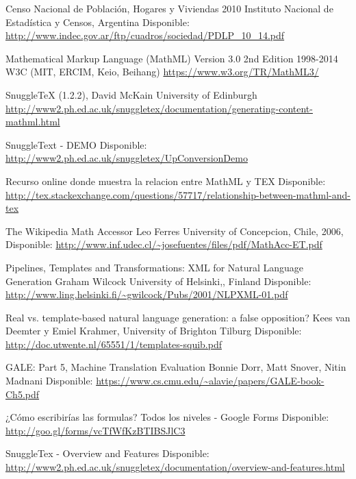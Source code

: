 \documentclass[
11pt, %
oneside, %
english, %
doublespacing, %
nolistspacing, %
parskip, %
parident,
headsepline, %
]{MastersDoctoralThesis} %
\begin{document}
\renewcommand{\bibname}{Referencias}
\begin{thebibliography}{99}

Censo Nacional de Población,
Hogares y Viviendas 2010
Instituto Nacional de Estadística y Censos, Argentina
Disponible: \url{http://www.indec.gov.ar/ftp/cuadros/sociedad/PDLP_10_14.pdf}

Mathematical Markup Language (MathML) Version 3.0 2nd Edition
1998-2014 W3C (MIT, ERCIM, Keio, Beihang)
\url{https://www.w3.org/TR/MathML3/}

SnuggleTeX (1.2.2), David McKain
University of Edinburgh
\url{http://www2.ph.ed.ac.uk/snuggletex/documentation/generating-content-mathml.html}

SnuggleText - DEMO
Disponible: \url{http://www2.ph.ed.ac.uk/snuggletex/UpConversionDemo}

Recurso online donde muestra la relacion entre MathML y TEX
Disponible: \url{http://tex.stackexchange.com/questions/57717/relationship-between-mathml-and-tex}

The Wikipedia Math Accessor
Leo Ferres
University of Concepcion, Chile, 2006,
Disponible: \url{http://www.inf.udec.cl/~josefuentes/files/pdf/MathAcc-ET.pdf}

Pipelines, Templates and Transformations: XML for Natural Language Generation
Graham Wilcock
University of Helsinki,, Finland
Disponible: \url{http://www.ling.helsinki.fi/~gwilcock/Pubs/2001/NLPXML-01.pdf}

Real vs. template-based natural language generation: a false opposition?
Kees van Deemter y Emiel Krahmer,
University of Brighton Tilburg
Disponible: \url{http://doc.utwente.nl/65551/1/templates-squib.pdf}

GALE: Part 5,  Machine Translation Evaluation
Bonnie Dorr, Matt Snover, Nitin Madnani
Disponible: \url{https://www.cs.cmu.edu/~alavie/papers/GALE-book-Ch5.pdf}

¿Cómo escribirías las formulas?
Todos los niveles - Google Forms
Disponible: \url{http://goo.gl/forms/vcTfWfKzBTIBSJlC3}

SnuggleTex - Overview and Features
Disponible: \url{http://www2.ph.ed.ac.uk/snuggletex/documentation/overview-and-features.html}

\end{thebibliography}
\end{document}
